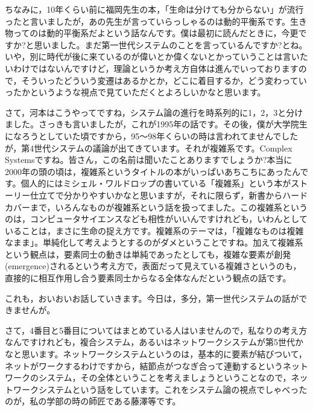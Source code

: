 \documentclass{ltjsbook}
\begin{document}
ちなみに，10年くらい前に福岡先生の本，「生命は分けても分からない」\parencite{FukuokaShin1}が流行ったと言いましたが，あの先生が言っていらっしゃるのは動的平衡系です。生き物ってのは動的平衡系だよという話なんです。僕は最初に読んだときに，今更ですか?と思いました。まだ第一世代システムのことを言っているんですか?とね。いや，別に時代が後に来ているのが偉いとか偉くないとかっていうことは言いたいわけではないんですけど，理論というか考え方自体は進んでいっておりますので，そういったどういう変遷はあるかとか，どこに着目するか，どう変わっていったかというような視点で見ていただくとよろしいかなと思います。

さて，河本はこうやってですね，システム論の進行を時系列的に1，2，3と分けました。さっきも言いましたが，これが1995年の話です。その後，僕が大学院生になろうとしていた頃ですから，95〜98年くらいの時は言われてませんでしたが，第4世代システムの議論が出てきています。それが複雑系です。Complex Systemsですね。皆さん，この名前は聞いたことありますでしょうか?本当に2000年の頭の頃は，複雑系というタイトルの本がいっぱいあちこちにあったんです。個人的にはミシェル・ワルドロップの書いている「複雑系」\parencite{Waldrop}という本がストーリー仕立てで分かりやすいかなと思いますが，それに限らず，新書からハードカバーまで，いろんなものが複雑系という話を扱ってました。この複雑系というのは，コンピュータサイエンスなども相性がいいんですけれども，いわんとしていることは，まさに生命の捉え方です。複雑系のテーマは，「複雑なものは複雑なまま」。単純化して考えようとするのがダメということですね。加えて複雑系という観点は，要素同士の動きは単純であったとしても，複雑な要素が創発(emergence)されるという考え方で，表面だって見えている複雑さというのも，直接的に相互作用し合う要素同士からなる全体なんだという観点の話です。

これも，おいおいお話していきます。今日は，多分，第一世代システムの話ができませんが。

さて，4番目と5番目についてはまとめている人はいませんので，私なりの考え方なんですけれども，複合システム，あるいはネットワークシステムが第5世代かなと思います。ネットワークシステムというのは，基本的に要素が結びついて，ネットがワークするわけですから，結節点がつなぎ合って連動するというネットワークのシステム，その全体ということを考えましょうということなので，ネットワークシステムという話をしています。これをシステム論の視点でしゃべったのが，私の学部の時の師匠である藤澤等です。
\end{document}
